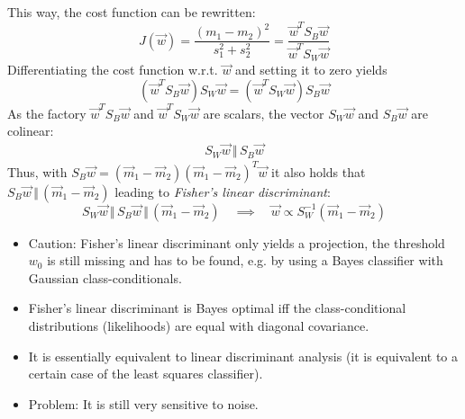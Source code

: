 				This way, the cost function can be rewritten:
				\begin{equation}
					J(\vec{w}) = \frac{(m_1 - m_2)^2}{s_1^2 + s_2^2} = \frac{\vec{w}^T S_B \vec{w}}{\vec{w}^T S_W \vec{w}}
				\end{equation}
				Differentiating the cost function w.r.t. \(\vec{w}\) and setting it to zero yields
				\begin{equation}
					(\vec{w}^T S_B \vec{w}) S_W \vec{w} = (\vec{w}^T S_W \vec{w}) S_B \vec{w}
				\end{equation}
				As the factory \( \vec{w}^T S_B \vec{w} \) and \( \vec{w}^T S_W \vec{w} \) are scalars, the vector \( S_W \vec{w} \) and \( S_B \vec{w} \) are colinear:
				\begin{eqnarray}
					S_W \vec{w} \,\Vert\, S_B \vec{w}
				\end{eqnarray}
				Thus, with \( S_B \vec{w} = (\vec{m}_1 - \vec{m}_2) (\vec{m}_1 - \vec{m}_2)^T \vec{w} \) it also holds that \( S_B \vec{w} \,\Vert\, (\vec{m}_1 - \vec{m}_2) \) leading to \emph{Fisher's linear discriminant}:
				\begin{equation}
					S_W \vec{w} \,\Vert\, S_B \vec{w} \,\Vert\, (\vec{m}_1 - \vec{m}_2) \quad\implies\quad \vec{w} \propto S_W^{-1} (\vec{m}_1 - \vec{m}_2)
				\end{equation}

				\begin{itemize}
					\item Caution: Fisher's linear discriminant only yields a projection, the threshold \(w_0\) is still missing and has to be found, e.g. by using a Bayes classifier with Gaussian class-conditionals.
					\item Fisher's linear discriminant is Bayes optimal iff the class-conditional distributions (likelihoods) are equal with diagonal covariance.
					\item It is essentially equivalent to linear discriminant analysis (it is equivalent to a certain case of the least squares classifier).
					\item Problem: It is still very sensitive to noise.
				\end{itemize}

